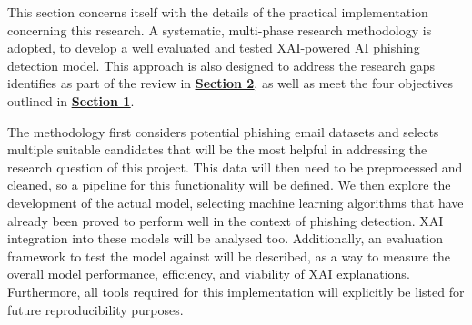 
This section concerns itself with the details of the practical implementation concerning this research. A systematic, multi-phase research methodology is adopted, to develop a well evaluated and tested XAI-powered AI phishing detection model. This approach is also designed to address the research gaps identifies as part of the review in \hyperref[sec:2-literature-review]{\uline{\textbf{Section 2}}}, as well as meet the four objectives outlined in \hyperref[sec:1-introduction]{\uline{\textbf{Section 1}}}.\newline

\noindent The methodology first considers potential phishing email datasets and selects multiple suitable candidates that will be the most helpful in addressing the research question of this project. This data will then need to be preprocessed and cleaned, so a pipeline for this functionality will be defined. We then explore the development of the actual model, selecting machine learning algorithms that have already been proved to perform well in the context of phishing detection. XAI integration into these models will be analysed too. Additionally, an evaluation framework to test the model against will be described, as a way to measure the overall model performance, efficiency, and viability of XAI explanations. Furthermore, all tools required for this implementation will explicitly be listed for future reproducibility purposes.
